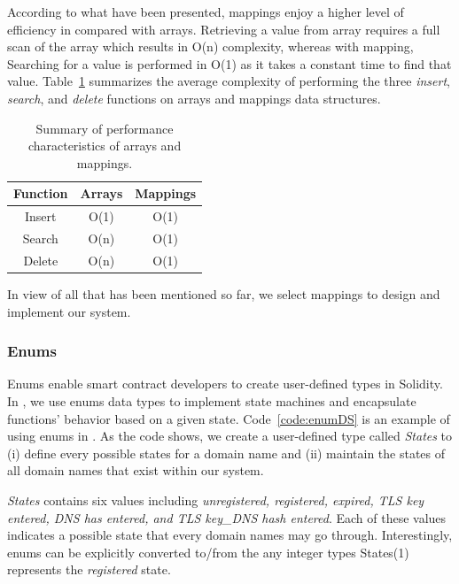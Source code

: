 According to what have been presented, mappings enjoy a higher level of efficiency in compared with arrays. Retrieving a value from array requires a full scan of the array which results in O(n) complexity, whereas with mapping, Searching for a value is performed in O(1) as it takes a constant time to find that value. Table~\ref{tab:complexity} summarizes the average complexity of performing the three \emph{insert}, \emph{search}, and \emph{delete} functions on arrays and mappings data structures. 
\begin{table}[h!]
\renewcommand{\arraystretch}{2}
\centering
 \begin{tabular}{||c | c | c||} 
 \hline
 Function & Arrays & Mappings\\ [2.5ex] 
 \hline\hline
Insert & O(1) & O(1)  \\ \hline
Search & O(n) & O(1)  \\ \hline
 Delete & O(n) & O(1)  \\[1ex] 
 \hline
 \end{tabular}
\caption{\footnotesize{Summary of performance characteristics of arrays and mappings.}}
\label{tab:complexity}
\end{table}
In view of all that has been mentioned so far, we select mappings to design and implement our system.


\subsubsection*{Enums}

Enums enable smart contract developers to create user-defined types in Solidity. In \Ghazalstar, we use enums data types to implement state machines and encapsulate functions' behavior based on a given state. Code~\ref{code:enumDS} is an example of using enums in \Ghazalstar. As the code shows, we create a user-defined type called \emph{States} to (i) define every possible states for a domain name and (ii) maintain the states of all domain names that exist within our system.

\emph{States} contains six values including \emph{unregistered, registered, expired, TLS key entered, DNS has entered, and TLS key\_DNS hash entered}. Each of these values indicates a possible state that every domain names may go through. Interestingly, enums can be explicitly converted to/from the any integer types \eg States(1) represents the \emph{registered} state.

